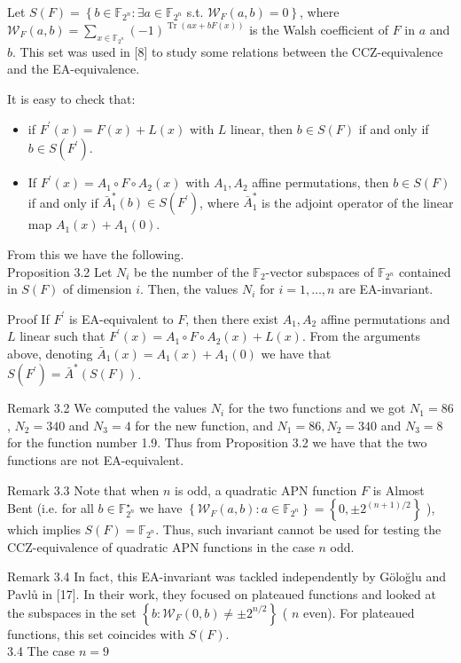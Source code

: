 \documentclass[10pt]{article}
\begin{document}
Let $S(F)=\left\{b \in \mathbb{F}_{2^{n}}: \exists a \in \mathbb{F}_{2^{n}}\right.$ s.t. $\left.\mathscr{W}_{F}(a, b)=0\right\}$, where $\mathscr{W}_{F}(a, b)=\sum_{x \in \mathbb{F}_{2^{n}}}(-1)^{\operatorname{Tr}(a x+b F(x))}$ is the Walsh coefficient of $F$ in $a$ and $b$. This set was used in [8] to study some relations between the CCZ-equivalence and the EA-equivalence.

It is easy to check that:

\begin{itemize}
  \item if $F^{\prime}(x)=F(x)+L(x)$ with $L$ linear, then $b \in S(F)$ if and only if $b \in S\left(F^{\prime}\right)$.
  \item If $F^{\prime}(x)=A_{1} \circ F \circ A_{2}(x)$ with $A_{1}, A_{2}$ affine permutations, then $b \in S(F)$ if and only if $\bar{A}_{1}^{*}(b) \in S\left(F^{\prime}\right)$, where $\bar{A}_{1}^{*}$ is the adjoint operator of the linear map $A_{1}(x)+A_{1}(0)$.
\end{itemize}

From this we have the following.\\
Proposition 3.2 Let $N_{i}$ be the number of the $\mathbb{F}_{2}$-vector subspaces of $\mathbb{F}_{2^{n}}$ contained in $S(F)$ of dimension $i$. Then, the values $N_{i}$ for $i=1, \ldots, n$ are EA-invariant.

Proof If $F^{\prime}$ is EA-equivalent to $F$, then there exist $A_{1}, A_{2}$ affine permutations and $L$ linear such that $F^{\prime}(x)=A_{1} \circ F \circ A_{2}(x)+L(x)$. From the arguments above, denoting $\bar{A}_{1}(x)=A_{1}(x)+A_{1}(0)$ we have that $S\left(F^{\prime}\right)=\bar{A}^{*}(S(F))$.

Remark 3.2 We computed the values $N_{i}$ for the two functions and we got $N_{1}=86$, $N_{2}=340$ and $N_{3}=4$ for the new function, and $N_{1}=86, N_{2}=340$ and $N_{3}=8$ for the function number 1.9. Thus from Proposition 3.2 we have that the two functions are not EA-equivalent.

Remark 3.3 Note that when $n$ is odd, a quadratic APN function $F$ is Almost Bent (i.e. for all $b \in \mathbb{F}_{2^{n}}^{\star}$ we have $\left\{\mathscr{W}_{F}(a, b): a \in \mathbb{F}_{2^{n}}\right\}=\left\{0, \pm 2^{(n+1) / 2}\right\}$ ), which implies $S(F)=\mathbb{F}_{2^{n}}$. Thus, such invariant cannot be used for testing the CCZ-equivalence of quadratic APN functions in the case $n$ odd.

Remark 3.4 In fact, this EA-invariant was tackled independently by Göloğlu and Pavlů in [17]. In their work, they focused on plateaued functions and looked at the subspaces in the set $\left\{b: \mathscr{W}_{F}(0, b) \neq \pm 2^{n / 2}\right\}$ ( $n$ even). For plateaued functions, this set coincides with $S(F)$.\\
3.4 The case $n=9$
\end{document}
